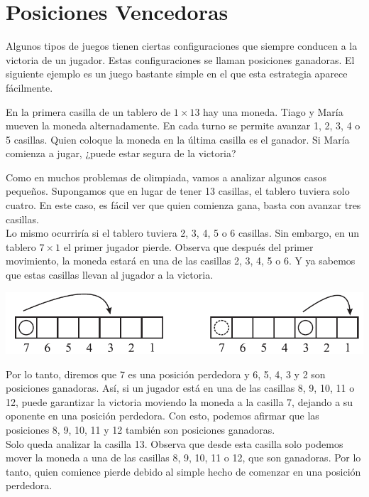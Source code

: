 \documentclass[11pt]{scrartcl}
\begin{document}
\section{Posiciones Vencedoras}

Algunos tipos de juegos tienen ciertas configuraciones que siempre conducen a la victoria de un jugador. Estas configuraciones se llaman posiciones ganadoras. El siguiente ejemplo es un juego bastante simple en el que esta estrategia aparece fácilmente.

\begin{example}
En la primera casilla de un tablero de $1 \times 13$ hay una moneda. Tiago y María mueven la moneda alternadamente. En cada turno se permite avanzar 1, 2, 3, 4 o 5 casillas. Quien coloque la moneda en la última casilla es el ganador. Si María comienza a jugar, ¿puede estar segura de la victoria?
\end{example}
Como en muchos problemas de olimpiada, vamos a analizar algunos casos pequeños. Supongamos que en lugar de tener 13 casillas, el tablero tuviera solo cuatro. En este caso, es fácil ver que quien comienza gana, basta con avanzar tres casillas. \\
Lo mismo ocurriría si el tablero tuviera 2, 3, 4, 5 o 6 casillas. Sin embargo, en un tablero $7 \times 1$ el primer jugador pierde. Observa que después del primer movimiento, la moneda estará en una de las casillas 2, 3, 4, 5 o 6. Y ya sabemos que estas casillas llevan al jugador a la victoria. \\
\begin{center}
    \includegraphics[scale=0.8]{images/clase_06_eje3.png}
\end{center}
Por lo tanto, diremos que 7 es una posición perdedora y 6, 5, 4, 3 y 2 son posiciones ganadoras. Así, si un jugador está en una de las casillas 8, 9, 10, 11 o 12, puede garantizar la victoria moviendo la moneda a la casilla 7, dejando a su oponente en una posición perdedora. Con esto, podemos afirmar que las posiciones 8, 9, 10, 11 y 12 también son posiciones ganadoras. \\
Solo queda analizar la casilla 13. Observa que desde esta casilla solo podemos mover la moneda a una de las casillas 8, 9, 10, 11 o 12, que son ganadoras. Por lo tanto, quien comience pierde debido al simple hecho de comenzar en una posición perdedora.\\
\end{document}
